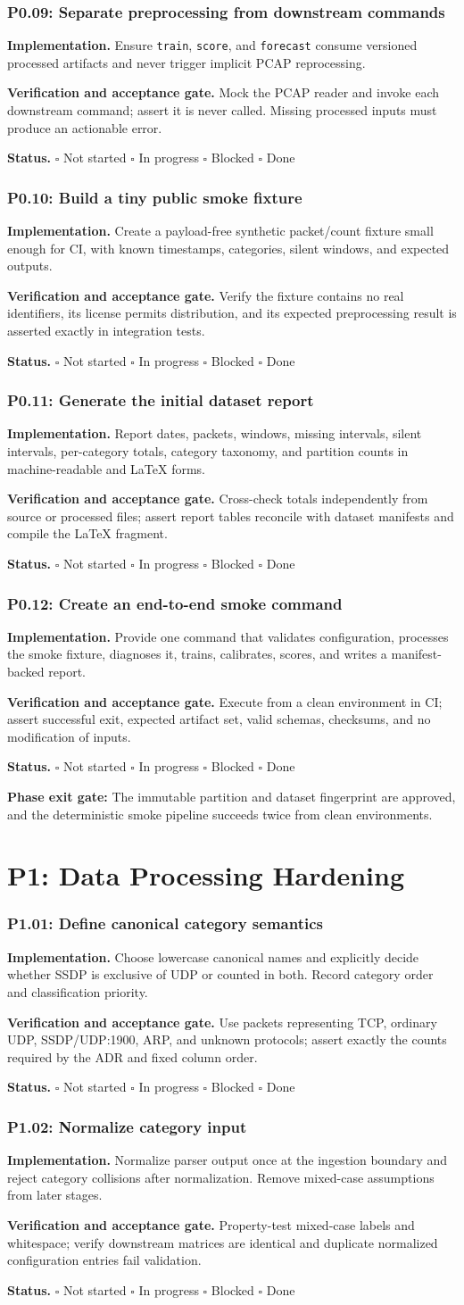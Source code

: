 \documentclass[11pt,a4paper]{article}
\newcommand{\status}{\(\square\) Not started \quad \(\square\) In progress \quad \(\square\) Blocked \quad \(\square\) Done}
\newcommand{\task}[4]{%
  \subsubsection{#1: #2}
  \textbf{Implementation.} #3

  \textbf{Verification and acceptance gate.} #4

  \textbf{Status.} \status
}
\newcommand{\artifact}[1]{\texttt{#1}}
\newcommand{\gate}[1]{\textcolor{blue!45!black}{\textbf{Phase exit gate:} #1}}
\begin{document}
\task{P0.09}{Separate preprocessing from downstream commands}{Ensure \artifact{train}, \artifact{score}, and \artifact{forecast} consume versioned processed artifacts and never trigger implicit PCAP reprocessing.}{Mock the PCAP reader and invoke each downstream command; assert it is never called. Missing processed inputs must produce an actionable error.}

\task{P0.10}{Build a tiny public smoke fixture}{Create a payload-free synthetic packet/count fixture small enough for CI, with known timestamps, categories, silent windows, and expected outputs.}{Verify the fixture contains no real identifiers, its license permits distribution, and its expected preprocessing result is asserted exactly in integration tests.}

\task{P0.11}{Generate the initial dataset report}{Report dates, packets, windows, missing intervals, silent intervals, per-category totals, category taxonomy, and partition counts in machine-readable and LaTeX forms.}{Cross-check totals independently from source or processed files; assert report tables reconcile with dataset manifests and compile the LaTeX fragment.}

\task{P0.12}{Create an end-to-end smoke command}{Provide one command that validates configuration, processes the smoke fixture, diagnoses it, trains, calibrates, scores, and writes a manifest-backed report.}{Execute from a clean environment in CI; assert successful exit, expected artifact set, valid schemas, checksums, and no modification of inputs.}

\gate{The immutable partition and dataset fingerprint are approved, and the deterministic smoke pipeline succeeds twice from clean environments.}

\section{P1: Data Processing Hardening}

\task{P1.01}{Define canonical category semantics}{Choose lowercase canonical names and explicitly decide whether SSDP is exclusive of UDP or counted in both. Record category order and classification priority.}{Use packets representing TCP, ordinary UDP, SSDP/UDP:1900, ARP, and unknown protocols; assert exactly the counts required by the ADR and fixed column order.}

\task{P1.02}{Normalize category input}{Normalize parser output once at the ingestion boundary and reject category collisions after normalization. Remove mixed-case assumptions from later stages.}{Property-test mixed-case labels and whitespace; verify downstream matrices are identical and duplicate normalized configuration entries fail validation.}
\end{document}
